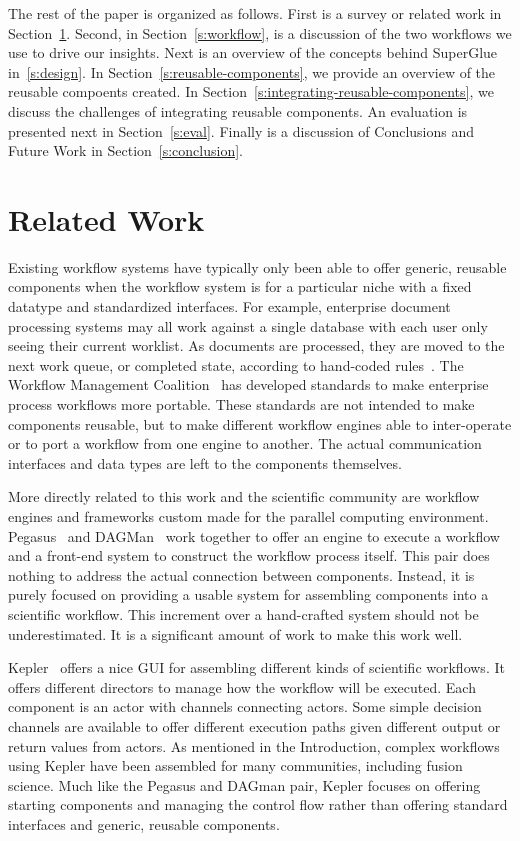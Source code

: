 \documentclass[conference]{IEEEtran}
\begin{document}
The rest of the paper is organized as follows. First is a survey or related
work in Section~\ref{s:related}. Second, in Section~\ref{s:workflow}, is a
discussion of the two workflows we use to drive our insights. Next is an
overview of the concepts behind SuperGlue in~\ref{s:design}.  In
Section~\ref{s:reusable-components}, we provide an overview of the reusable
compoents created. In Section~\ref{s:integrating-reusable-components}, we
discuss the challenges of integrating reusable components.  An evaluation is
presented next in Section~\ref{s:eval}. Finally is a discussion of Conclusions
and Future Work in Section~\ref{s:conclusion}.

\section{Related Work}
\label{s:related}

Existing workflow systems have typically only been able to offer generic,
reusable components when the workflow system is for a particular niche with a
fixed datatype and standardized interfaces. For example, enterprise document
processing systems may all work against a single database with each user only
seeing their current worklist. As documents are processed, they are moved to
the next work queue, or completed state, according to hand-coded
rules~\cite{mckesson-workflow}. The Workflow Management Coalition~\cite{wfmc}
has developed standards to make enterprise process workflows more portable.
These standards are not intended to make components reusable, but to make
different workflow engines able to inter-operate or to port a workflow from one
engine to another.  The actual communication interfaces and data types are left
to the components themselves.

More directly related to this work and the scientific community are workflow
engines and frameworks custom made for the parallel computing environment.
Pegasus~\cite{mullender:pegasus} and DAGMan~\cite{Malewicz:2006:dagman} work
together to offer an engine to execute a workflow and a front-end system to
construct the workflow process itself. This pair does nothing to address the
actual connection between components. Instead, it is purely focused on
providing a usable system for assembling components into a scientific workflow.
This increment over a hand-crafted system should not be underestimated. It is a
significant amount of work to make this work well.

Kepler~\cite{bertram:2006:kepler} offers a nice GUI for assembling different
kinds of scientific workflows. It offers different directors to manage how the
workflow will be executed. Each component is an actor with channels connecting
actors. Some simple decision channels are available to offer different
execution paths given different output or return values from actors. As
mentioned in the Introduction, complex workflows using Kepler have been
assembled for many communities, including fusion science. Much like the Pegasus
and DAGman pair, Kepler focuses on offering starting components and managing
the control flow rather than offering standard interfaces and generic, reusable
components.
\end{document}
